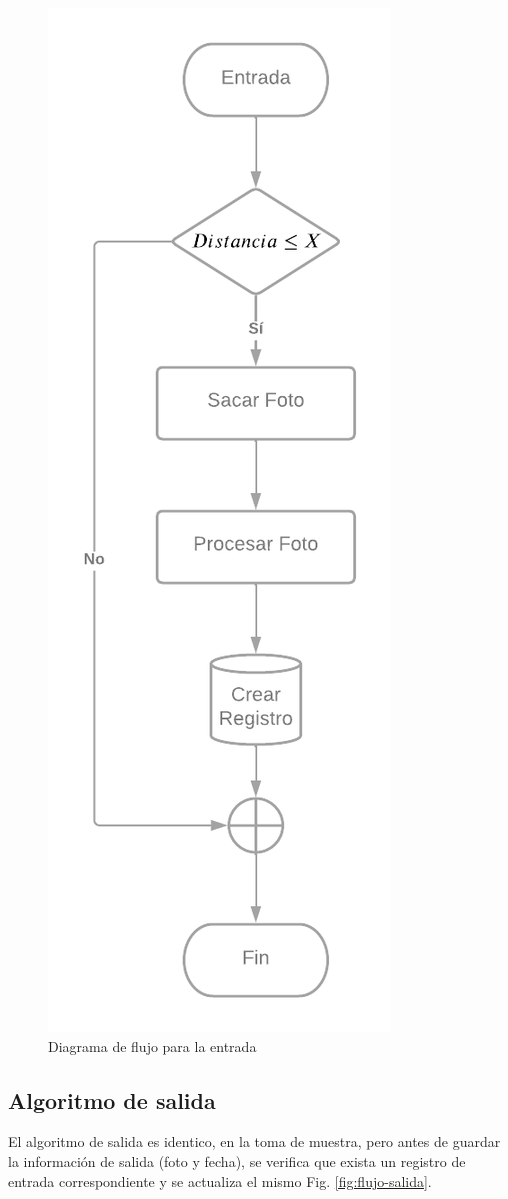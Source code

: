 \begin{figure}
    \centering
    \includegraphics[width=.5\textwidth]{imgs/flujo-entrada.png}
    \caption{Diagrama de flujo para la entrada}
    \label{fig:flujo-entrada}
\end{figure}

\subsection{Algoritmo de salida}

El algoritmo de salida es identico, en la toma de muestra, pero antes de guardar la información de salida (foto y fecha), se verifica que exista un registro de entrada correspondiente y se actualiza el mismo Fig. \ref{fig:flujo-salida}.

